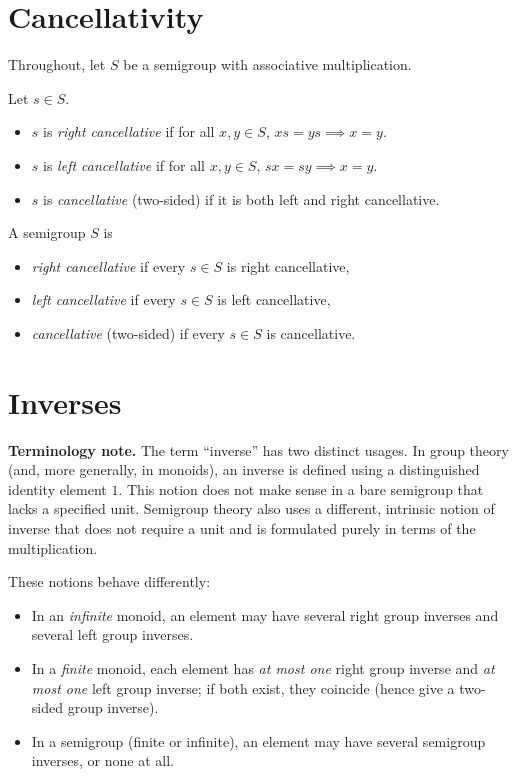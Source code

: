 \section{Cancellativity}

Throughout, let \(S\) be a semigroup with associative multiplication.

\begin{definition}
\label{def:cancellative-element}
Let \(s\in S\).
\begin{itemize}
  \item \(s\) is \emph{right cancellative} if for all \(x,y\in S\), \(x s = y s \implies x = y\).
  \item \(s\) is \emph{left cancellative} if for all \(x,y\in S\), \(s x = s y \implies x = y\).
  \item \(s\) is \emph{cancellative} (two-sided) if it is both left and right cancellative.
\end{itemize}
\end{definition}

\begin{definition}
\label{def:cancellative-semigroup}
A semigroup \(S\) is
\begin{itemize}
  \item \emph{right cancellative} if every \(s\in S\) is right cancellative,
  \item \emph{left cancellative} if every \(s\in S\) is left cancellative,
  \item \emph{cancellative} (two-sided) if every \(s\in S\) is cancellative.
\end{itemize}
\end{definition}

\section{Inverses}

\noindent\textbf{Terminology note.}
The term “inverse” has two distinct usages. In group theory (and, more generally, in monoids), an inverse is defined using a distinguished identity element \(1\). This notion does not make sense in a bare semigroup that lacks a specified unit. Semigroup theory also uses a different, intrinsic notion of inverse that does not require a unit and is formulated purely in terms of the multiplication.

These notions behave differently:
\begin{itemize}
  \item In an \emph{infinite} monoid, an element may have several right group inverses and several left group inverses.
  \item In a \emph{finite} monoid, each element has \emph{at most one} right group inverse and \emph{at most one} left group inverse; if both exist, they coincide (hence give a two-sided group inverse).
  \item In a semigroup (finite or infinite), an element may have several semigroup inverses, or none at all.
\end{itemize}

